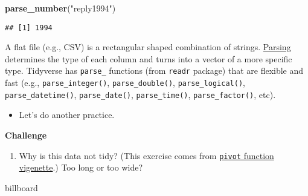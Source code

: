 \documentclass[
]{book}
\newenvironment{Shaded}{\begin{snugshade}}{\end{snugshade}}
\newcommand{\KeywordTok}[1]{\textcolor[rgb]{0.13,0.29,0.53}{\textbf{#1}}}
\newcommand{\NormalTok}[1]{#1}
\newcommand{\StringTok}[1]{\textcolor[rgb]{0.31,0.60,0.02}{#1}}
\providecommand{\tightlist}{%
  \setlength{\itemsep}{0pt}\setlength{\parskip}{0pt}}
\begin{document}
\begin{Shaded}
\begin{Highlighting}[]
\KeywordTok{parse\_number}\NormalTok{(}\StringTok{"reply1994"}\NormalTok{)}
\end{Highlighting}
\end{Shaded}

\begin{verbatim}
## [1] 1994
\end{verbatim}

A flat file (e.g., CSV) is a rectangular shaped combination of strings. \href{https://cran.r-project.org/web/packages/readr/vignettes/readr.html}{Parsing} determines the type of each column and turns into a vector of a more specific type. Tidyverse has \texttt{parse\_} functions (from \texttt{readr} package) that are flexible and fast (e.g., \texttt{parse\_integer()}, \texttt{parse\_double()}, \texttt{parse\_logical()}, \texttt{parse\_datetime()}, \texttt{parse\_date()}, \texttt{parse\_time()}, \texttt{parse\_factor()}, etc).

\begin{itemize}
\tightlist
\item
  Let's do another practice.
\end{itemize}

\textbf{Challenge}

\begin{enumerate}
\def\labelenumi{\arabic{enumi}.}
\tightlist
\item
  Why is this data not tidy? (This exercise comes from \href{https://tidyr.tidyverse.org/articles/pivot.html}{\texttt{pivot} function vigenette}.) Too long or too wide?
\end{enumerate}

\begin{Shaded}
\begin{Highlighting}[]
\NormalTok{billboard}
\end{Highlighting}
\end{Shaded}
\end{document}
